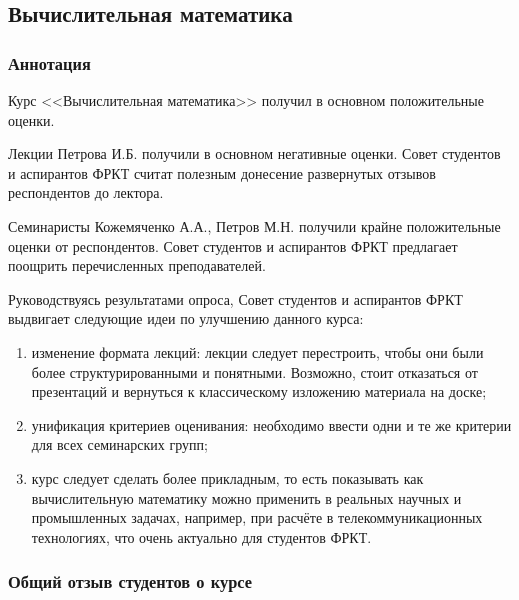 \subsection{Вычислительная математика}
	
	\subsubsection{Аннотация}

        Курс <<Вычислительная математика>> получил в основном положительные оценки. 
        
        Лекции Петрова И.Б. получили в основном негативные оценки. Совет студентов и аспирантов ФРКТ считат полезным донесение развернутых отзывов респондентов до лектора.

        Семинаристы Кожемяченко А.А., Петров М.Н. получили крайне положительные оценки от респондентов. Совет студентов и аспирантов ФРКТ предлагает поощрить перечисленных преподавателей.
        
        Руководствуясь результатами опроса, Совет студентов и аспирантов ФРКТ выдвигает следующие идеи по улучшению данного курса:
        \begin{enumerate}
            \item изменение формата лекций: лекции следует перестроить, чтобы они были более структурированными и понятными. Возможно, стоит отказаться от презентаций и вернуться к классическому изложению материала на доске;
            \item унификация критериев оценивания: необходимо ввести одни и те же критерии для всех семинарских групп;
            \item курс следует сделать более прикладным, то есть показывать как вычислительную математику можно применить в реальных научных и промышленных задачах, например, при расчёте в телекоммуникационных технологиях, что очень актуально для студентов ФРКТ.
        \end{enumerate}

	\subsubsection{Общий отзыв студентов о курсе}

